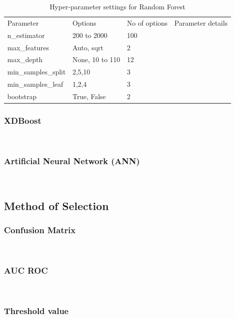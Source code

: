 \begin{table}[h]
    \begin{tabular}{llll}
    Parameter           & Options         & No of options & Parameter details                                    \\
    n\_estimator        & 200 to 2000     & 100           \\
    max\_features       & Auto, sqrt      & 2             \\
    max\_depth          & None, 10 to 110 & 12            \\
    min\_samples\_split & 2,5,10          & 3              \\
    min\_samples\_leaf  & 1,2,4           & 3              \\
    bootstrap           & True, False     & 2              \\
    \end{tabular}
    \caption{Hyper-parameter settings for Random Forest}
    \label{tab:RF_param}
\end{table}


\subsubsection{XDBoost}\hspace*{\fill} \\
\subsubsection{Artificial Neural Network (ANN)}\hspace*{\fill} \\





\subsection{Method of Selection}
\subsubsection{Confusion Matrix}\hspace*{\fill} \\
\subsubsection{AUC ROC}\hspace*{\fill} \\
\subsubsection{Threshold value}\hspace*{\fill} \\

